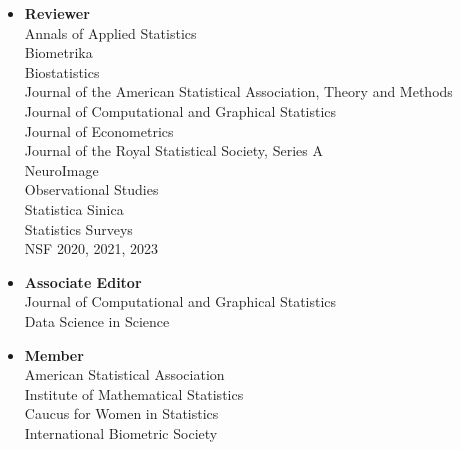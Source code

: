 \documentclass[11pt]{article}
\newcommand{\tab}{\hspace*{2em}}
\begin{document}
\begin{itemize}
	\item[] \textbf{Reviewer}  \\
	\tab Annals of Applied Statistics \\ 
	\tab Biometrika \\
	\tab Biostatistics \\
	\tab Journal of the American Statistical Association, Theory and Methods \\
	\tab Journal of Computational and Graphical Statistics \\ 
	\tab Journal of Econometrics \\
	\tab Journal of the Royal Statistical Society, Series A \\
	\tab NeuroImage \\
	\tab Observational Studies \\
	\tab Statistica Sinica \\
	\tab Statistics Surveys \\ 
	\tab NSF 2020, 2021, 2023 \vspace{-2mm}
	\item[] \textbf{Associate Editor}  \\
	\tab Journal of Computational and Graphical Statistics \\
	\tab  Data Science in Science \vspace{-2mm}
	\item[] \textbf{Member} \\
	\tab American Statistical Association \\
	\tab  Institute of Mathematical Statistics \\
	\tab Caucus for Women in Statistics \\
	\tab  International Biometric Society 
\end{itemize}
\end{document}
